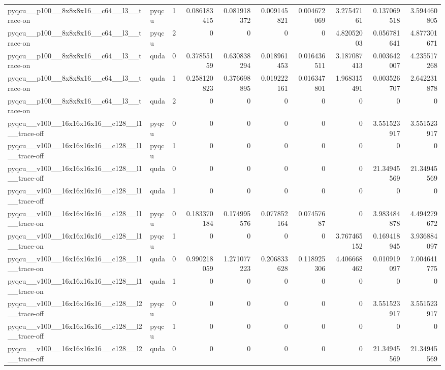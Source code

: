\begin{table}[htbp]
\begin{tabular}{@{}llrrrrrrrr@{}}
pyqcu\_\_p100\_\_8x8x8x16\_\_c64\_\_l3\_\_trace-on & pyqcu & 1 & 0.086183415 & 0.081918372 & 0.009145821 & 0.004672069 & 3.27547161 & 0.137069518 & 3.594460805 \\
pyqcu\_\_p100\_\_8x8x8x16\_\_c64\_\_l3\_\_trace-on & pyqcu & 2 & 0 & 0 & 0 & 0 & 4.82052003 & 0.056781641 & 4.877301671 \\
pyqcu\_\_p100\_\_8x8x8x16\_\_c64\_\_l3\_\_trace-on & quda & 0 & 0.37855159 & 0.630838294 & 0.018961453 & 0.016436511 & 3.187087413 & 0.003642007 & 4.235517268 \\
pyqcu\_\_p100\_\_8x8x8x16\_\_c64\_\_l3\_\_trace-on & quda & 1 & 0.258120823 & 0.376698895 & 0.019222161 & 0.016347801 & 1.968315491 & 0.003526707 & 2.642231878 \\
pyqcu\_\_p100\_\_8x8x8x16\_\_c64\_\_l3\_\_trace-on & quda & 2 & 0 & 0 & 0 & 0 & 0 & 0 & 0 \\
pyqcu\_\_v100\_\_16x16x16x16\_\_c128\_\_l1\_\_trace-off & pyqcu & 0 & 0 & 0 & 0 & 0 & 0 & 3.551523917 & 3.551523917 \\
pyqcu\_\_v100\_\_16x16x16x16\_\_c128\_\_l1\_\_trace-off & pyqcu & 1 & 0 & 0 & 0 & 0 & 0 & 0 & 0 \\
pyqcu\_\_v100\_\_16x16x16x16\_\_c128\_\_l1\_\_trace-off & quda & 0 & 0 & 0 & 0 & 0 & 0 & 21.34945569 & 21.34945569 \\
pyqcu\_\_v100\_\_16x16x16x16\_\_c128\_\_l1\_\_trace-off & quda & 1 & 0 & 0 & 0 & 0 & 0 & 0 & 0 \\
pyqcu\_\_v100\_\_16x16x16x16\_\_c128\_\_l1\_\_trace-on & pyqcu & 0 & 0.183370184 & 0.174995576 & 0.077852164 & 0.07457687 & 0 & 3.983484878 & 4.494279672 \\
pyqcu\_\_v100\_\_16x16x16x16\_\_c128\_\_l1\_\_trace-on & pyqcu & 1 & 0 & 0 & 0 & 0 & 3.767465152 & 0.169418945 & 3.936884097 \\
pyqcu\_\_v100\_\_16x16x16x16\_\_c128\_\_l1\_\_trace-on & quda & 0 & 0.990218059 & 1.271077223 & 0.206833628 & 0.118925306 & 4.406668462 & 0.010919097 & 7.004641775 \\
pyqcu\_\_v100\_\_16x16x16x16\_\_c128\_\_l1\_\_trace-on & quda & 1 & 0 & 0 & 0 & 0 & 0 & 0 & 0 \\
pyqcu\_\_v100\_\_16x16x16x16\_\_c128\_\_l2\_\_trace-off & pyqcu & 0 & 0 & 0 & 0 & 0 & 0 & 3.551523917 & 3.551523917 \\
pyqcu\_\_v100\_\_16x16x16x16\_\_c128\_\_l2\_\_trace-off & pyqcu & 1 & 0 & 0 & 0 & 0 & 0 & 0 & 0 \\
pyqcu\_\_v100\_\_16x16x16x16\_\_c128\_\_l2\_\_trace-off & quda & 0 & 0 & 0 & 0 & 0 & 0 & 21.34945569 & 21.34945569 \\

\end{tabular}
\end{table}

